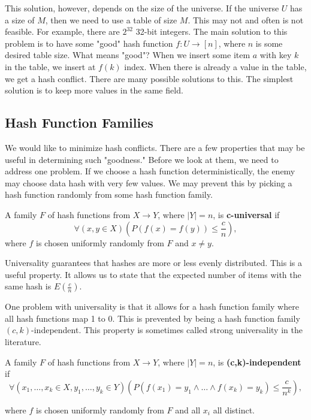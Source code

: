 This solution, however, depends on the size of the universe. If the universe $U$ has a size of $M$, then we need to use a table of size $M$. This may not and often is not feasible. For example, there are $2^{32}$ 32-bit integers. The main solution to this problem is to have some "good" hash function $f:U \rightarrow [n]$, where $n$ is some desired table size. What means "good"? When we insert some item $a$ with key $k$ in the table, we insert at $f(k)$ index. When there is already a value in the table, we get a hash conflict. There are many possible solutions to this. The simplest solution is to keep more values in the same field.


\subsection{Hash Function Families}
We would like to minimize hash conflicts. There are a few properties that may be useful in determining such "goodness." Before we look at them, we need to address one problem. If we choose a hash function deterministically, the enemy may choose data hash with very few values. We may prevent this by picking a hash function randomly from some hash function family.

\begin{defn}
A family \( F \) of hash functions from \( X \rightarrow Y \), where \( |Y| = n \), is \textbf{c-universal} if 
\[ \forall (x, y \in X) \left( P\left(f(x) = f(y)\right) \leq \frac{c}{n} \right), \]
where \( f \) is chosen uniformly randomly from \( F \) and \(x \neq y \).
\end{defn}

Universality guarantees that hashes are more or less evenly distributed. This is a useful property. It allows us to state that the expected number of items with the same hash is $E(\frac{c}{n})$. 

One problem with universality is that it allows for a hash function family where all hash functions map  1 to 0. This is prevented by being a hash function family $(c,k)$-independent. This property is sometimes called strong universality in the literature.

\begin{defn}
A family \( F \) of hash functions from \( X \rightarrow Y \), where \( |Y| = n \), is \textbf{(c,k)-independent} if 
\[ \forall (x_1, \dots, x_k \in X, y_1, \dots, y_k \in Y) \left( P\left(f(x_1) = y_1 \land \dots \land f(x_k) = y_k\right) \leq \frac{c}{n^k} \right), \]

where \( f \) is chosen uniformly randomly from \( F \) and all $x_i$ all distinct.

\end{defn}

